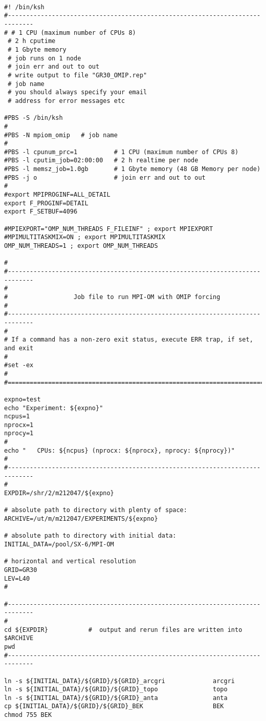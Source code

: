 \begin{footnotesize}
\begin{verbatim}

#! /bin/ksh
#-----------------------------------------------------------------------------
# # 1 CPU (maximum number of CPUs 8)
 # 2 h cputime
 # 1 Gbyte memory
 # job runs on 1 node
 # join err and out to out
 # write output to file "GR30_OMIP.rep"
 # job name
 # you should always specify your email 
 # address for error messages etc

#PBS -S /bin/ksh
#
#PBS -N mpiom_omip   # job name
#
#PBS -l cpunum_prc=1          # 1 CPU (maximum number of CPUs 8)
#PBS -l cputim_job=02:00:00   # 2 h realtime per node
#PBS -l memsz_job=1.0gb       # 1 Gbyte memory (48 GB Memory per node)
#PBS -j o                     # join err and out to out
#
#export MPIPROGINF=ALL_DETAIL
export F_PROGINF=DETAIL
export F_SETBUF=4096

#MPIEXPORT="OMP_NUM_THREADS F_FILEINF" ; export MPIEXPORT
#MPIMULTITASKMIX=ON ; export MPIMULTITASKMIX
OMP_NUM_THREADS=1 ; export OMP_NUM_THREADS

#
#-----------------------------------------------------------------------------
#
#                  Job file to run MPI-OM with OMIP forcing
#
#-----------------------------------------------------------------------------
#
# If a command has a non-zero exit status, execute ERR trap, if set, and exit
#
#set -ex
#
#=============================================================================

expno=test
echo "Experiment: ${expno}"
ncpus=1
nprocx=1
nprocy=1
#
echo "   CPUs: ${ncpus} (nprocx: ${nprocx}, nprocy: ${nprocy})" 
#
#-----------------------------------------------------------------------------
#
EXPDIR=/shr/2/m212047/${expno}

# absolute path to directory with plenty of space:
ARCHIVE=/ut/m/m212047/EXPERIMENTS/${expno}

# absolute path to directory with initial data:
INITIAL_DATA=/pool/SX-6/MPI-OM

# horizontal and vertical resolution
GRID=GR30
LEV=L40
#

#-----------------------------------------------------------------------------
#
cd ${EXPDIR}           #  output and rerun files are written into $ARCHIVE
pwd
#-----------------------------------------------------------------------------

ln -s ${INITIAL_DATA}/${GRID}/${GRID}_arcgri             arcgri
ln -s ${INITIAL_DATA}/${GRID}/${GRID}_topo               topo
ln -s ${INITIAL_DATA}/${GRID}/${GRID}_anta               anta
cp ${INITIAL_DATA}/${GRID}/${GRID}_BEK                   BEK
chmod 755 BEK


\end{verbatim}
\end{footnotesize}
